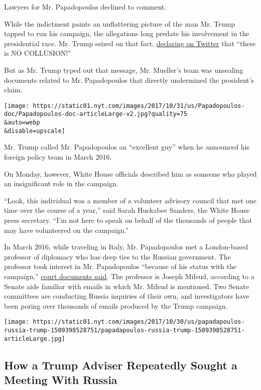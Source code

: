 Lawyers for Mr. Papadopoulos declined to comment.

While the indictment paints an unflattering picture of the man Mr. Trump
tapped to run his campaign, the allegations long predate his involvement
in the presidential race. Mr. Trump seized on that fact,
\href{https://twitter.com/realDonaldTrump/status/925006418989715456}{declaring
on Twitter} that ``there is NO COLLUSION!''

But as Mr. Trump typed out that message, Mr. Mueller's team was
unsealing documents related to Mr. Papadopoulos that directly undermined
the president's claim.

\texttt{[image: https://static01.nyt.com/images/2017/10/31/us/Papadopoulos-doc/Papadopoulos-doc-articleLarge-v2.jpg?quality=75\\\&auto=webp\\\&disable=upscale]}

Mr. Trump called Mr. Papadopoulos an ``excellent guy'' when he announced
his foreign policy team in March 2016.

On Monday, however, White House officials described him as someone who
played an insignificant role in the campaign.

``Look, this individual was a member of a volunteer advisory council
that met one time over the course of a year,'' said Sarah Huckabee
Sanders, the White House press secretary. ``I'm not here to speak on
behalf of the thousands of people that may have volunteered on the
campaign.''

In March 2016, while traveling in Italy, Mr. Papadopoulos met a
London-based professor of diplomacy who has deep ties to the Russian
government. The professor took interest in Mr. Papadopoulos ``because of
his status with the campaign,''
\href{https://www.justice.gov/file/1007336/download}{court documents
said}. The professor is Joseph Mifsud, according to a Senate aide
familiar with emails in which Mr. Mifsud is mentioned. Two Senate
committees are conducting Russia inquiries of their own, and
investigators have been poring over thousands of emails produced by the
Trump campaign.

\href{https://www.nytimes.com/interactive/2017/10/30/us/politics/papadopoulos-russia-trump.html}{}

\texttt{[image: https://static01.nyt.com/images/2017/10/30/us/papadapoulos-russia-trump-1509398528751/papadapoulos-russia-trump-1509398528751-articleLarge.jpg]}

\hypertarget{how-a-trump-adviser-repeatedly-sought-a-meeting-with-russia}{%
\subsection{How a Trump Adviser Repeatedly Sought a Meeting With
Russia}\label{how-a-trump-adviser-repeatedly-sought-a-meeting-with-russia}}


